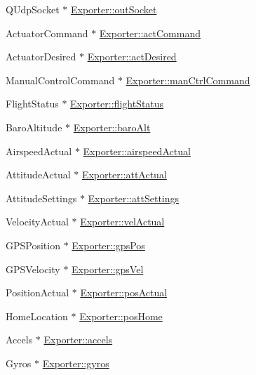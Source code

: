 \begin{DoxyCompactItemize}
\-Q\-Udp\-Socket $\ast$ \hyperlink{group___mo_cap_plugin_gad4adc615f73413f479e48983cce6f3e0}{\-Exporter\-::out\-Socket}
\item 
\-Actuator\-Command $\ast$ \hyperlink{group___mo_cap_plugin_gaaa8cd64f3935d77113b41cf84f398e78}{\-Exporter\-::act\-Command}
\item 
\-Actuator\-Desired $\ast$ \hyperlink{group___mo_cap_plugin_ga480be6f8874e252461095878c7b41d08}{\-Exporter\-::act\-Desired}
\item 
\-Manual\-Control\-Command $\ast$ \hyperlink{group___mo_cap_plugin_ga8855725831e82f6e02e0caba72c0dd7b}{\-Exporter\-::man\-Ctrl\-Command}
\item 
\-Flight\-Status $\ast$ \hyperlink{group___mo_cap_plugin_ga63bef489a0fb9ccf02eadc577d487c10}{\-Exporter\-::flight\-Status}
\item 
\-Baro\-Altitude $\ast$ \hyperlink{group___mo_cap_plugin_ga15711fcb53727148f4c62b5bfa1ce9f1}{\-Exporter\-::baro\-Alt}
\item 
\-Airspeed\-Actual $\ast$ \hyperlink{group___mo_cap_plugin_ga933ba2309643df8ddd342ae4cf010fca}{\-Exporter\-::airspeed\-Actual}
\item 
\-Attitude\-Actual $\ast$ \hyperlink{group___mo_cap_plugin_gaa96960187d095cbbc69ba0cc08d776a7}{\-Exporter\-::att\-Actual}
\item 
\-Attitude\-Settings $\ast$ \hyperlink{group___mo_cap_plugin_gaa7be67cf3fe5bd561bfd56b81ace46d6}{\-Exporter\-::att\-Settings}
\item 
\-Velocity\-Actual $\ast$ \hyperlink{group___mo_cap_plugin_gaf7dc7b4cb9c561edf9c8df28131eeac3}{\-Exporter\-::vel\-Actual}
\item 
\-G\-P\-S\-Position $\ast$ \hyperlink{group___mo_cap_plugin_gab8839ee3d842d22d5717905f7dea20cd}{\-Exporter\-::gps\-Pos}
\item 
\-G\-P\-S\-Velocity $\ast$ \hyperlink{group___mo_cap_plugin_ga75de3c84f1e0fec7aec493cb1a27b9a8}{\-Exporter\-::gps\-Vel}
\item 
\-Position\-Actual $\ast$ \hyperlink{group___mo_cap_plugin_ga48e371afeb39f31ab368d804798313f5}{\-Exporter\-::pos\-Actual}
\item 
\-Home\-Location $\ast$ \hyperlink{group___mo_cap_plugin_ga9a7c0ada8bbd6bf8c95ca54f123befbe}{\-Exporter\-::pos\-Home}
\item 
\-Accels $\ast$ \hyperlink{group___mo_cap_plugin_ga4dd5a6587431c70720881c0540f065c9}{\-Exporter\-::accels}
\item 
\-Gyros $\ast$ \hyperlink{group___mo_cap_plugin_ga2b6042b4adabe6985d92cc22f33cfc9a}{\-Exporter\-::gyros}

\end{DoxyCompactItemize}
